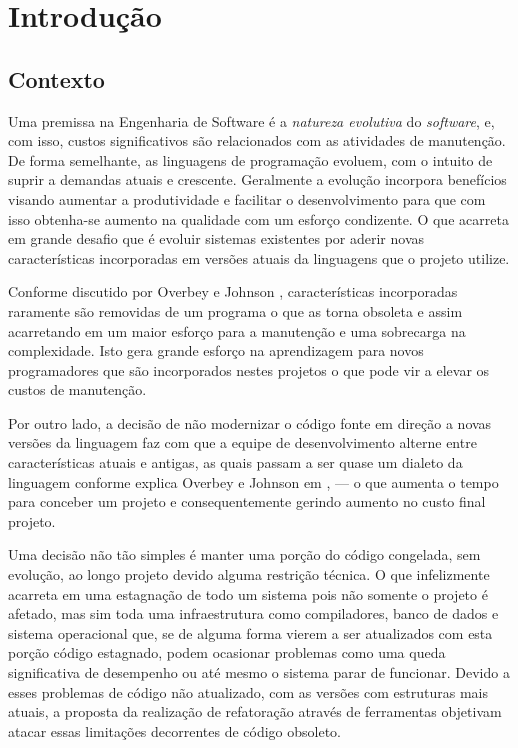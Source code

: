 \chapter{Introdução}



\section{Contexto}
Uma premissa na Engenharia de Software é a \emph{natureza evolutiva} do \textit{software}, e, com isso, custos significativos são relacionados com as atividades de manutenção. De forma semelhante, as linguagens de programação evoluem, com o intuito de suprir a demandas atuais e crescente. Geralmente a evolução incorpora benefícios visando aumentar a produtividade e facilitar o desenvolvimento para que com isso obtenha-se aumento na qualidade com um esforço condizente. O que acarreta em grande desafio que é evoluir sistemas existentes por aderir novas características incorporadas em versões atuais da linguagens \cite{Dyer:2013} que o projeto utilize.

Conforme discutido por Overbey e Johnson \cite{Overbey:2009}, características incorporadas raramente são removidas de um programa o que as torna obsoleta e assim acarretando em um maior esforço para a manutenção e uma  sobrecarga na complexidade. Isto gera grande esforço na aprendizagem para novos programadores  que são incorporados nestes projetos o que pode vir a elevar os custos de manutenção. 

Por outro lado, a decisão de não modernizar o código fonte em direção a novas versões da linguagem faz com que a equipe de desenvolvimento alterne entre características atuais e antigas, as quais passam a ser quase um dialeto da linguagem conforme explica Overbey e Johnson em \cite{Overbey:2009}, --- o que aumenta o tempo para conceber um projeto e consequentemente gerindo aumento no custo final projeto.

Uma decisão não tão simples é manter uma porção do código congelada, sem evolução, ao longo projeto devido alguma restrição técnica. O que infelizmente acarreta em uma estagnação de todo um sistema pois não somente o projeto é afetado, mas sim toda uma infraestrutura como compiladores, banco de dados e sistema operacional que, se de alguma forma vierem a ser atualizados com esta porção código estagnado, podem ocasionar problemas como uma queda significativa de desempenho ou até mesmo o sistema parar de funcionar. Devido a esses problemas de código não atualizado, com as versões com estruturas mais atuais, a proposta da realização de refatoração através de ferramentas objetivam atacar essas limitações decorrentes de código obsoleto.

